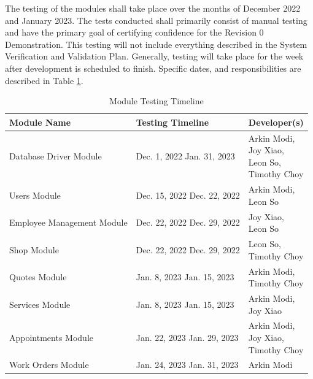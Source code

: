 \documentclass[12pt, titlepage]{article}
\begin{document}
The testing of the modules shall take place over the months of December 2022 and January 2023. The
tests conducted shall primarily consist of manual testing and have the primary goal of certifying
confidence for the Revision 0 Demonstration. This testing will not include everything described in
the System Verification and Validation Plan. Generally, testing will take place for the week after
development is scheduled to finish. Specific dates, and responsibilities are described in Table
\ref{ModuleTestingTimeline}.

\begin{table}[H]
	\caption{Module Testing Timeline} \label{ModuleTestingTimeline}
	\begin{tabular}{|p{}|p{}|p{}|}
		\hline
		\textbf{Module Name}       & \textbf{Testing Timeline}                 & \textbf{Developer(s)}    \\
		\hline
		Database Driver Module     & Dec. 1, 2022 \textemdash{} Jan. 31, 2023  & \makecell[l]{Arkin Modi, \\Joy Xiao,\\Leon So,\\Timothy Choy} \\
		\hline
		Users Module               & Dec. 15, 2022 \textemdash{} Dec. 22, 2022 & \makecell[l]{Arkin Modi, \\Leon So} \\
		\hline
		Employee Management Module & Dec. 22, 2022 \textemdash{} Dec. 29, 2022 & \makecell[l]{Joy Xiao,   \\Leon So} \\
		\hline
		Shop Module                & Dec. 22, 2022 \textemdash{} Dec. 29, 2022 & \makecell[l]{Leon So,    \\Timothy Choy} \\
		\hline
		Quotes Module              & Jan. 8, 2023 \textemdash{} Jan. 15, 2023  & \makecell[l]{Arkin Modi, \\Timothy Choy} \\
		\hline
		Services Module            & Jan. 8, 2023 \textemdash{} Jan. 15, 2023  & \makecell[l]{Arkin Modi, \\Joy Xiao} \\
		\hline
		Appointments Module        & Jan. 22, 2023 \textemdash{} Jan. 29, 2023 & \makecell[l]{Arkin Modi, \\Joy Xiao,\\Timothy Choy} \\
		\hline
		Work Orders Module         & Jan. 24, 2023 \textemdash{} Jan. 31, 2023 & Arkin Modi               \\
		\hline
	\end{tabular}
\end{table}
\end{document}
